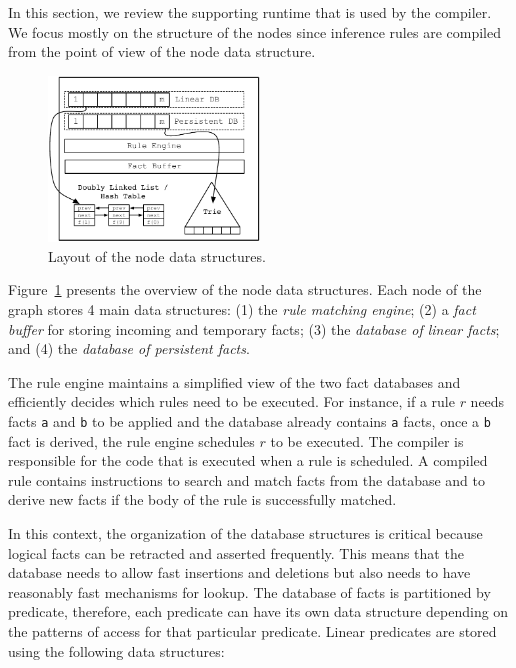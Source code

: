 In this section, we review the supporting runtime that is used by the compiler.
We focus mostly on the structure of the nodes since inference rules are compiled
from the point of view of the node data structure.

\begin{figure}
\begin{center}
   \includegraphics[width=0.5\textwidth]{figures/overview.pdf}
\end{center}
\caption{Layout of the node data structures.}
\label{fig:node}
\end{figure}

Figure~\ref{fig:node} presents the overview of the node data structures.  Each
node of the graph stores 4 main data structures: (1) the \emph{rule matching
engine}; (2) a \emph{fact buffer} for storing incoming and temporary facts;
(3) the \emph{database of linear facts}; and (4) the \emph{database of
persistent facts}.

The rule engine maintains a simplified view of the two fact databases and
efficiently decides which rules need to be executed. For instance, if a rule $r$
needs facts \texttt{a} and \texttt{b} to be applied and the database already
contains \texttt{a} facts, once a \texttt{b} fact is derived, the rule engine
schedules $r$ to be executed. The compiler is responsible
for the code that is executed when a rule is scheduled.  A compiled rule
contains instructions to search and match facts from the database and to
derive new facts if the body of the rule is successfully matched.

In this context, the organization of the database structures is critical because
logical facts can be retracted and asserted frequently. This means that the
database needs to allow fast insertions and deletions but also needs to have
reasonably fast mechanisms for lookup. The database of facts is partitioned by
predicate, therefore, each predicate can have its own data structure depending
on the patterns of access for that particular predicate. Linear predicates are
stored using the following data structures:

